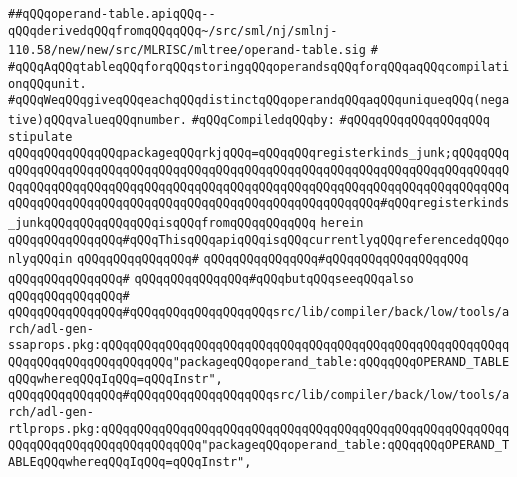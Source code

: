 \label{src/lib/compiler/back/low/treecode/operand-table.api}
\verb|##qQQqoperand-table.apiqQQq--qQQqderivedqQQqfromqQQqqQQq~/src/sml/nj/smlnj-110.58/new/new/src/MLRISC/mltree/operand-table.sig|\newline
\verb|#|\newline
\verb|#qQQqAqQQqtableqQQqforqQQqstoringqQQqoperandsqQQqforqQQqaqQQqcompilationqQQqunit.|\newline
\verb|#qQQqWeqQQqgiveqQQqeachqQQqdistinctqQQqoperandqQQqaqQQquniqueqQQq(negative)qQQqvalueqQQqnumber.|\newline
\newline
\verb|#qQQqCompiledqQQqby:|\newline
\verb|#qQQqqQQqqQQqqQQqqQQq|\newline
\newline
\verb|stipulate|\newline
\verb|qQQqqQQqqQQqqQQqpackageqQQqrkjqQQq=qQQqqQQqregisterkinds_junk;qQQqqQQqqQQqqQQqqQQqqQQqqQQqqQQqqQQqqQQqqQQqqQQqqQQqqQQqqQQqqQQqqQQqqQQqqQQqqQQqqQQqqQQqqQQqqQQqqQQqqQQqqQQqqQQqqQQqqQQqqQQqqQQqqQQqqQQqqQQqqQQqqQQqqQQqqQQqqQQqqQQqqQQqqQQqqQQqqQQqqQQqqQQqqQQqqQQqqQQq#qQQqregisterkinds_junkqQQqqQQqqQQqqQQqisqQQqfromqQQqqQQqqQQq|\newline
\verb|herein|\newline
\verb|qQQqqQQqqQQqqQQq#qQQqThisqQQqapiqQQqisqQQqcurrentlyqQQqreferencedqQQqonlyqQQqin|\newline
\verb|qQQqqQQqqQQqqQQq#|\newline
\verb|qQQqqQQqqQQqqQQq#qQQqqQQqqQQqqQQqqQQq|\newline
\verb|qQQqqQQqqQQqqQQq#|\newline
\verb|qQQqqQQqqQQqqQQq#qQQqbutqQQqseeqQQqalso|\newline
\verb|qQQqqQQqqQQqqQQq#|\newline
\verb|qQQqqQQqqQQqqQQq#qQQqqQQqqQQqqQQqqQQqsrc/lib/compiler/back/low/tools/arch/adl-gen-ssaprops.pkg:qQQqqQQqqQQqqQQqqQQqqQQqqQQqqQQqqQQqqQQqqQQqqQQqqQQqqQQqqQQqqQQqqQQqqQQqqQQqqQQq"packageqQQqoperand_table:qQQqqQQqOPERAND_TABLEqQQqwhereqQQqIqQQq=qQQqInstr",|\newline
\verb|qQQqqQQqqQQqqQQq#qQQqqQQqqQQqqQQqqQQqsrc/lib/compiler/back/low/tools/arch/adl-gen-rtlprops.pkg:qQQqqQQqqQQqqQQqqQQqqQQqqQQqqQQqqQQqqQQqqQQqqQQqqQQqqQQqqQQqqQQqqQQqqQQqqQQqqQQqqQQq"packageqQQqoperand_table:qQQqqQQqOPERAND_TABLEqQQqwhereqQQqIqQQq=qQQqInstr",|\newline

